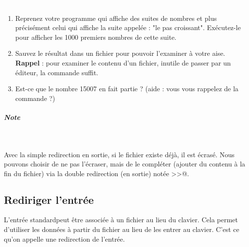 \documentclass[11pt,a4paper]{article}
\begin{document}
					\textcolor{white}{.} \par
				
            \par
        
					\begin{enumerate}
				
			\item 
						Reprenez votre programme qui affiche
						des suites de nombres et plus pr\'ecis\'ement
						celui qui affiche la suite appel\'ee :
						"le pas croissant".
						Ex\'ecutez-le pour
						afficher les 1000 premiers nombres de cette suite.
					
			\item 
						Sauvez le r\'esultat dans un fichier
						pour pouvoir l'examiner \`a votre aise.
						\textbf{Rappel} :
						pour examiner le contenu d'un fichier,
						inutile de passer par un \'editeur,
						la commande
						\verb@more@
						suffit.
					
			\item 
						Est-ce que le nombre 15007 en fait partie ?
						(aide : vous vous rappelez de la commande
						\verb@grep@ ?)
					
					\end{enumerate}
				
			
		\subparagraph{Note} 
		
					\textcolor{white}{.} \par
				
            \par
        
					Avec la simple redirection en sortie, 
					si le fichier existe d\'ej\`a, il est \'ecras\'e. 
					Nous pouvons choisir de ne pas l'\'ecraser, 
					mais de le compl\'eter 
					(ajouter du contenu \`a la fin du fichier) 
					via la double redirection (en sortie) not\'ee 
					\verb@>>@.			
				
            \par
        \subsection{Rediriger l'entr\'ee}
					L'\guillemotleft entr\'ee standard\guillemotright  peut \^etre associ\'ee \`a un 
					fichier au lieu du clavier.
					Cela permet d'utiliser les donn\'ees \`a partir du fichier 
					au lieu de les entrer au clavier.
					C'est ce qu'on appelle une redirection de l'entr\'ee.
				
            \par
        
\end{document}
